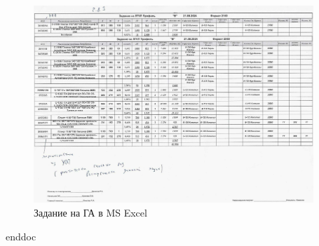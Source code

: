 \begin{figure}
\begin{center}
  \includegraphics[height=0.94\textheight, width=0.94\textwidth, keepaspectratio]{Pics 1/2.8.3 задание от плановика на производство_0001.jpg}
\end{center}
  \caption{Задание на ГА в MS Excel}
  \label{pic:2.8.3 задание от плановика на производство_0001.jpg}
\end{figure}







\clearpage

 {enddoc}